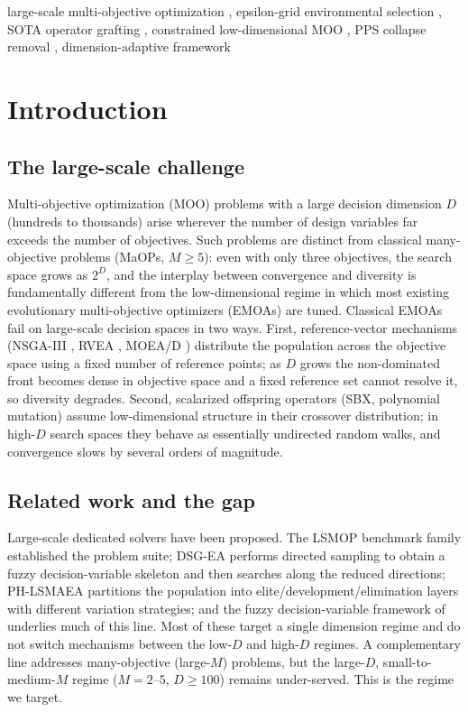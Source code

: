 \documentclass[preprint,12pt]{elsarticle}
\begin{document}
\begin{frontmatter}
\begin{keyword}
large-scale multi-objective optimization \sep
epsilon-grid environmental selection \sep
SOTA operator grafting \sep
constrained low-dimensional MOO \sep
PPS collapse removal \sep
dimension-adaptive framework
\end{keyword}

\end{frontmatter}

\section{Introduction}
\label{sec:intro}

\subsection{The large-scale challenge}

Multi-objective optimization (MOO) problems with a large decision dimension
$D$ (hundreds to thousands) arise wherever the number of design variables far
exceeds the number of objectives. Such problems are distinct from classical
many-objective problems (MaOPs, $M \ge 5$): even with only three objectives,
the search space grows as $2^D$, and the interplay between convergence and
diversity is fundamentally different from the low-dimensional regime in which
most existing evolutionary multi-objective optimizers (EMOAs) are tuned.
Classical EMOAs fail on large-scale decision spaces in two ways. First,
reference-vector mechanisms (NSGA-III \cite{deb2014an}, RVEA
\cite{cheng2016a}, MOEA/D \cite{qingfuzhang2007moead}) distribute the
population across the objective space using a fixed number of reference
points; as $D$ grows the non-dominated front becomes dense in objective
space and a fixed reference set cannot resolve it, so diversity degrades.
Second, scalarized offspring operators (SBX, polynomial mutation) assume
low-dimensional structure in their crossover distribution; in high-$D$ search
spaces they behave as essentially undirected random walks, and convergence
slows by several orders of magnitude.

\subsection{Related work and the gap}

Large-scale dedicated solvers have been proposed. The LSMOP benchmark family
\cite{cheng2017test} established the problem suite; DSG-EA
\cite{zou2024two} performs directed sampling to obtain a fuzzy
decision-variable skeleton and then searches along the reduced directions;
PH-LSMAEA \cite{wang2024population} partitions the population into
elite/development/elimination layers with different variation strategies;
and the fuzzy decision-variable framework of \cite{yang2023a} underlies much
of this line. Most of these target a single dimension regime and do not
switch mechanisms between the low-$D$ and high-$D$ regimes. A complementary
line addresses many-objective (large-$M$) problems, but the large-$D$,
small-to-medium-$M$ regime ($M = 2$--$5$, $D \ge 100$) remains
under-served. This is the regime we target.
\end{document}
